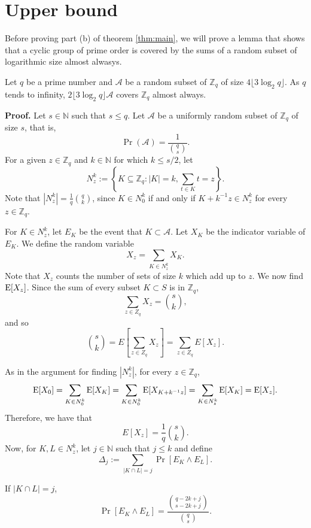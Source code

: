 \section{Upper bound}\label{sec:results:upperbound}
Before proving part (b) of theorem \ref{thm:main}, we will prove a lemma that shows that a cyclic group of prime order is covered by the sums of a random subset of logarithmic size almost alwasys.
\begin{lemma}\label{lem:sumset}
    Let $q$ be a prime number and $\mathcal{A}$ be a random subset of $\mathbb{Z}_q$ of size $4\lfloor3\log_2 q\rfloor$. As $q$ tends to infinity, $2\lfloor3\log_2 q\rfloor \mathcal{A}$ covers $\mathbb{Z}_q$ almost always. 
\end{lemma}

\textbf{Proof. } Let $s \in \mathbb{N}$ such that $s\leq q$. Let $\mathcal{A}$ be a uniformly random subset of $\mathbb{Z}_q$ of size $s$, that is, 
\[\Pr(\mathcal{A}) = \frac{1}{\binom{q}{s}}.\]
For a given $z \in \mathbb{Z}_q$ and $k \in \mathbb{N}$ for which $k \leq s/2$, let 
\[N_z^k := \left\{K \subseteq \mathbb{Z}_q: |K| = k, \sum_{t \in K} t = z\right\}.\]
Note that $|N_z^k| = \frac{1}{q}{\binom{q}{k}}$, since $K \in N_0^k$ if and only if $K + k^{-1}z \in N_z^k$ for every $z \in \mathbb{Z}_q$.\par
For $K \in N_z^k$, let $E_K$ be the event that $K \subset\mathcal{A}$. Let $X_K$ be the indicator variable of $E_K$.
We define the random variable 
\[X_z = \sum_{K \in N_z^k} X_K.\]
Note that $X_z$ counts the number of sets of size $k$ which add up to $z$. We now find $\mathrm{E}[X_z]$. Since the sum of every subset $K \subset S$ is in $\mathbb{Z}_q$,
\[\sum_{z \in Z_q} X_z = {\binom{s}{k}},\]
and so
\[\binom{s}{k} = E\left[\sum_{z \in Z_q} X_z\right] =  \sum_{z \in Z_q} E[X_z].\]\par
As in the argument for finding $|N_z^k|$, for every $z \in \mathbb{Z}_q$, 
\[\mathrm{E}[X_0] = \sum_{K \in N_0^k}\mathrm{E}[X_K] = \sum_{K \in N_0^k} \mathrm{E}[X_{K + k^{-1}z}] = \sum_{K \in N_z^k} \mathrm{E}[X_K] = \mathrm{E}[X_z].\]
Therefore, we have that
\begin{equation}\label{eq:upperbound:expected}
E[X_z] = \frac{1}{q} {\binom{s}{k}}.
\end{equation}
Now, for $K, L \in N_z^k$, let $j \in \mathbb{N}$ such that $j \leq k$ and define
\[\Delta_j := \sum_{|K \cap L| = j} \Pr[E_K \land E_L].\]
\par 
If $|K \cap L| = j$,
\[\Pr[E_K \land E_L] = \frac{\binom{q - 2k + j}{s - 2k + j}}{\binom{q}{s}}.\]
\par
